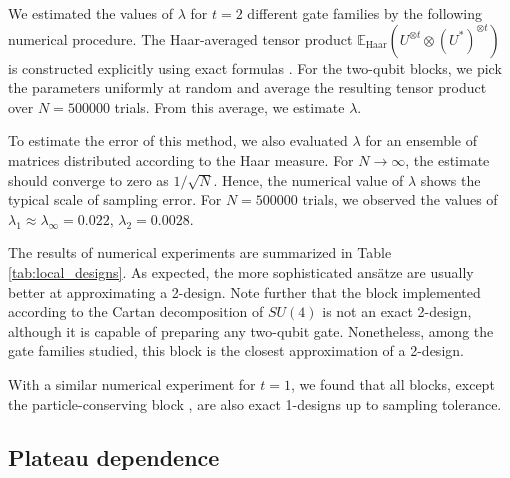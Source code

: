 We estimated the values of $\lambda$ for $t=2$ different gate families by the following numerical procedure. The Haar-averaged tensor product $\mathbb{E}_{\text{Haar}} (U^{\otimes t} \otimes (U^*)^{\otimes t})$ is constructed explicitly using exact formulas \cite{mcclean_barren_2018,poland_no_2020}. 
For the two-qubit blocks, we pick the parameters uniformly at random and average the resulting tensor product over $N=500000$ trials. From this average, we estimate $\lambda$.

To estimate the error of this method, we also evaluated $\lambda$ for an ensemble of matrices distributed according to the Haar measure. For $N \rightarrow \infty$, the estimate should converge to zero as $1/\sqrt{N}$. Hence, the numerical value of $\lambda$ shows the typical scale of sampling error. For $N=500000$ trials, we observed the values of $\lambda_1 \approx \lambda_\infty = 0.022$, $\lambda_2 = 0.0028$.

The results of numerical experiments are summarized in Table \ref{tab:local_designs}. As expected, the more sophisticated ans\"atze are usually better at approximating a 2-design. Note further that the block implemented according to the Cartan decomposition of $SU(4)$ \cite{khaneja_cartan_2000,khaneja_time_2001} is not an exact 2-design, although it is capable of preparing any two-qubit gate. Nonetheless, among the gate families studied, this block is the closest approximation of a 2-design.

With a similar numerical experiment for $t=1$, we found that all blocks, except the particle-conserving block \cite{barkoutsos_quantum_2018}, are also exact 1-designs up to sampling tolerance.

\subsection{Plateau dependence}
\label{subsec:plateau_numeric}

